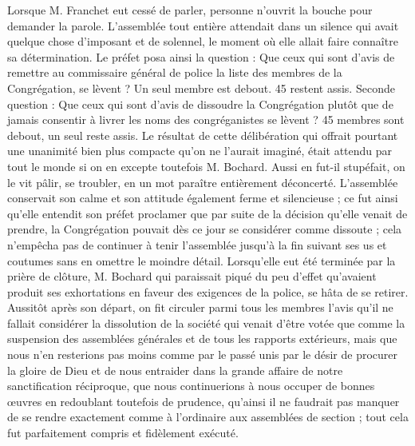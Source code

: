 Lorsque M. Franchet eut cessé de parler, personne n'ouvrit la bouche pour demander la parole. L'assemblée tout entière attendait dans un silence qui avait quelque chose d'imposant et de solennel, le moment où elle allait faire connaître sa détermination. Le préfet posa ainsi la question : Que ceux qui sont d'avis de remettre au commissaire général de police la liste des membres de la Congrégation, se lèvent ? Un seul membre est debout. 45 restent assis. Seconde question : Que ceux qui sont d'avis de dissoudre la Congrégation plutôt que de jamais consentir à livrer les noms des congréganistes se lèvent ? 45 membres sont debout, un seul reste assis. Le résultat de cette délibération qui offrait pourtant une unanimité bien plus compacte qu'on ne l'aurait imaginé, était attendu par tout le monde si on en excepte toutefois M. Bochard. Aussi en fut-il stupéfait, on le vit pâlir, se troubler, en un mot paraître entièrement déconcerté. L'assemblée conservait son calme et son attitude également ferme et silencieuse ; ce fut ainsi qu'elle entendit son préfet proclamer que par suite de la décision qu'elle venait de prendre, la Congrégation pouvait dès ce jour se considérer comme dissoute ; cela n'empêcha pas de continuer à tenir l'assemblée jusqu'à la fin suivant ses us et coutumes sans en omettre le moindre détail. Lorsqu'elle eut été terminée par la prière de clôture, M. Bochard qui paraissait piqué
du peu d'effet qu'avaient produit ses exhortations en faveur des exigences de la police, se hâta de se retirer. Aussitôt après son départ, on fit circuler parmi tous les membres l'avis qu'il ne fallait considérer la dissolution de la société qui venait d'être votée que comme la suspension des assemblées générales et de tous les rapports extérieurs, mais que nous n'en resterions pas moins comme par le passé unis par le désir de procurer la gloire de Dieu et de nous entraider dans la grande affaire de notre sanctification réciproque, que nous continuerions à nous occuper de bonnes œuvres en redoublant toutefois de prudence, qu'ainsi il ne faudrait pas manquer de se rendre exactement comme à l'ordinaire aux assemblées de section ; tout cela fut parfaitement compris et fidèlement exécuté.

